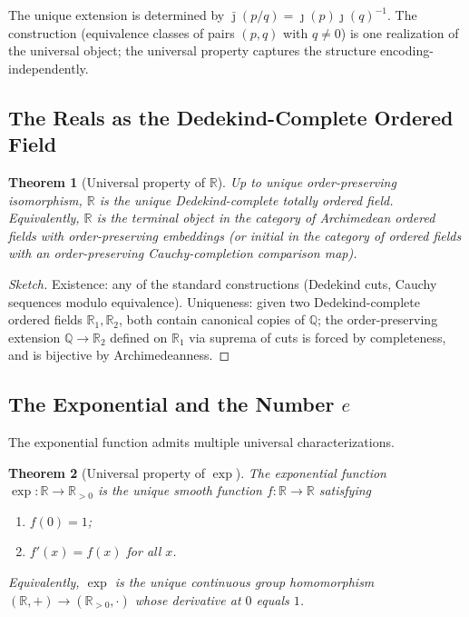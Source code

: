 \documentclass[12pt]{article}
\newtheorem{theorem}{Theorem}[section]
\theoremstyle{definition}
\theoremstyle{remark}
\newcommand{\Q}{\mathbb{Q}}
\newcommand{\R}{\mathbb{R}}
\begin{document}
The unique extension is determined by $\bar{\jmath}(p/q) = \jmath(p) \jmath(q)^{-1}$. The construction (equivalence classes of pairs $(p, q)$ with $q \neq 0$) is one realization of the universal object; the universal property captures the structure encoding-independently.

\subsection{The Reals as the Dedekind-Complete Ordered Field}

\begin{theorem}[Universal property of $\R$]
\label{thm:R-up}
Up to unique order-preserving isomorphism, $\R$ is the unique Dedekind-complete totally ordered field. Equivalently, $\R$ is the terminal object in the category of Archimedean ordered fields with order-preserving embeddings (or initial in the category of ordered fields with an order-preserving Cauchy-completion comparison map).
\end{theorem}

\begin{proof}[Sketch]
Existence: any of the standard constructions (Dedekind cuts, Cauchy sequences modulo equivalence). Uniqueness: given two Dedekind-complete ordered fields $\R_1, \R_2$, both contain canonical copies of $\Q$; the order-preserving extension $\Q \to \R_2$ defined on $\R_1$ via suprema of cuts is forced by completeness, and is bijective by Archimedeanness.
\end{proof}

\subsection{The Exponential and the Number \texorpdfstring{$e$}{e}}

The exponential function admits multiple universal characterizations.

\begin{theorem}[Universal property of $\exp$]
\label{thm:exp-up}
The exponential function $\exp \colon \R \to \R_{>0}$ is the unique smooth function $f \colon \R \to \R$ satisfying
\begin{enumerate}
  \item $f(0) = 1$;
  \item $f'(x) = f(x)$ for all $x$.
\end{enumerate}
Equivalently, $\exp$ is the unique continuous group homomorphism $(\R, +) \to (\R_{>0}, \cdot)$ whose derivative at $0$ equals $1$.
\end{theorem}
\end{document}
